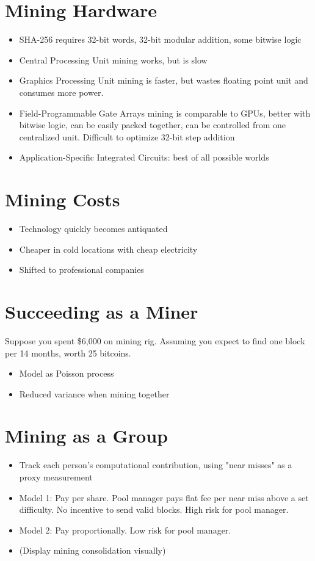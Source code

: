 \documentclass{article}
\begin{document}
\section{Mining Hardware}
\begin{itemize}
\item SHA-256 requires 32-bit words, 32-bit modular addition, some bitwise logic
\item Central Processing Unit mining works, but is slow
\item Graphics Processing Unit mining is faster, but wastes floating point unit and consumes more power.
\item Field-Programmable Gate Arrays mining is comparable to GPUs, better with bitwise logic, can be easily packed together, can be controlled from one centralized unit. Difficult to optimize 32-bit step addition
\item Application-Specific Integrated Circuits: best of all possible worlds
\end{itemize}

\section{Mining Costs}
\begin{itemize}
\item Technology quickly becomes antiquated
\item Cheaper in cold locations with cheap electricity
\item Shifted to professional companies
\end{itemize}

\section{Succeeding as a Miner}
Suppose you spent \$6,000 on mining rig. Assuming you expect to find one block per 14 months, worth 25 bitcoins.
\begin{itemize}
\item Model as Poisson process
\item Reduced variance when mining together
\end{itemize}

\section{Mining as a Group}
\begin{itemize}
\item Track each person's computational contribution, using "near misses" as a proxy measurement
\item Model 1: Pay per share. Pool manager pays flat fee per near miss above a set difficulty. No incentive to send valid blocks. High risk for pool manager.
\item Model 2: Pay proportionally. Low risk for pool manager.
\item (Display mining consolidation visually)
\end{itemize}
\end{document}
